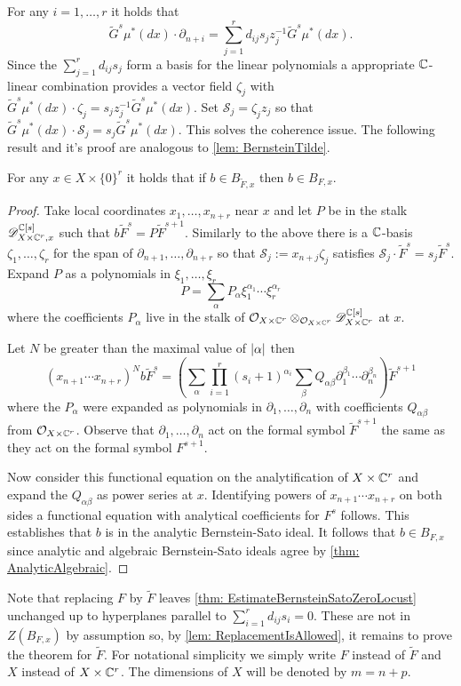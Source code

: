 For any $i=1,\ldots,r$ it holds that
$$\widetilde{G}^s \mu^*(dx)\cdot \partial_{n+i} = \sum_{j=1}^r d_{ij}s_j z_j^{-1} \widetilde{G}^s \mu^*(dx).$$
Since the $\sum_{j=1}^r d_{ij}s_j$ form a basis for the linear polynomials a appropriate $\mathbb{C}$-linear combination provides a vector field $\zeta_j$ with $\widetilde{G}^s \mu^*(dx)\cdot \zeta_j = s_{j}z_j^{-1}\widetilde{G}^s \mu^*(dx)$.
Set $\mathcal{S}_j = \zeta_jz_j$ so that $\widetilde{G}^s \mu^*(dx) \cdot \mathcal{S}_j = s_j \widetilde{G}^s \mu^*(dx) $.
This solves the coherence issue.
The following result and it's proof are analogous to \cref{lem: BernsteinTilde}.
\begin{lemma}\label{lem: ReplacementIsAllowed}
  For any $x\in X\times \{0\}^r$ it holds that if $b\in B_{\widetilde{F},x}$ then $b \in B_{F,x}$.
\end{lemma}
\begin{proof}
  Take local coordinates $x_1,\ldots, x_{n+r}$ near $x$ and let $P$ be in the stalk $\mathscr{D}_{X\times \mathbb{C}^r,x}^{\mathbb{C}[s]}$ such that $b \widetilde{F}^s = P \widetilde{F}^{s+1}$.
  Similarly to the above there is a $\mathbb{C}$-basis $\zeta_1,\ldots,\zeta_r$ for the span of $\partial_{n+1}, \ldots, \partial_{n+r}$ so that $\mathcal{S}_j := x_{n+j}\zeta_j$ satisfies $\mathcal{S}_j \cdot \widetilde{F}^s = s_{j}\widetilde{F}^s$.
  Expand $P$ as a polynomials in $\xi_1,\ldots,\xi_r$
  $$P = \sum_{\alpha} P_\alpha \xi_{1}^{\alpha_1}\cdots \xi_{r}^{\alpha_r}$$
  where the coefficients $P_\alpha$ live in the stalk of $\mathcal{O}_{X\times \mathbb{C}^r}\otimes_{\mathcal{O}_{X\times \mathbb{C}^r}}\mathscr{D}_{X\times \mathbb{C}^r}^{\mathbb{C}[s]}$ at $x$.

  Let $N$ be greater than the maximal value of $\vert \alpha \vert$ then
  $$(x_{n+1}\cdots x_{n+r})^N b \widetilde{F}^s = \left(\sum_{\alpha} \prod_{i=1}^r (s_i + 1)^{\alpha_i} \sum_\beta Q_{\alpha\beta} \partial_1^{\beta_1}\cdots \partial_n^{\beta_n} \right)\widetilde{F}^{s+1}$$
  where the $P_\alpha$ were expanded as polynomials in $\partial_1,\ldots,\partial_n$ with coefficients $Q_{\alpha\beta}$ from $\mathcal{O}_{X\times \mathbb{C}^r}$.
  Observe that $\partial_1,\ldots, \partial_n$ act on the formal symbol $\widetilde{F}^{s+1}$ the same as they act on the formal symbol $F^{s+1}$.

  Now consider this functional equation on the analytification of $X\times \mathbb{C}^r$ and expand the $Q_{\alpha\beta}$ as power series at $x$.
  Identifying powers of $x_{n+1}\cdots x_{n+r}$ on both sides a functional equation with analytical coefficients for $F^s$ follows.
  This establishes that $b$ is in the analytic Bernstein-Sato ideal.
  It follows that $ b\in B_{F,x}$ since analytic and algebraic Bernstein-Sato ideals agree by \cref{thm: AnalyticAlgebraic}.
\end{proof}
Note that replacing $F$ by $\widetilde{F}$ leaves \cref{thm: EstimateBernsteinSatoZeroLocust} unchanged up to hyperplanes parallel to $\sum_{i=1}^r d_{ij}s_i = 0$.
These are not in $Z(B_{F,x})$ by assumption so, by \cref{lem: ReplacementIsAllowed}, it remains to prove the theorem for $\widetilde{F}$.
For notational simplicity we simply write $F$ instead of $\widetilde{F}$ and $X$ instead of $X\times \mathbb{C}^r$.
The dimensions of $X$ will be denoted by $m = n+p$.

